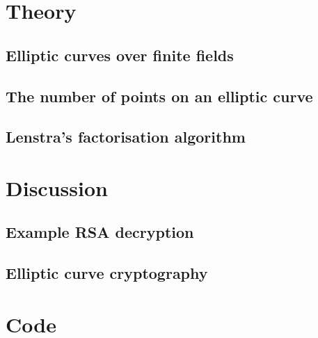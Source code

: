 \documentclass[a4paper,12pt,titlepage,oneside]{article}
\begin{document}
\section{Theory}
\label{theory-section}
\subsection{Elliptic curves over finite fields}

\subsection{The number of points on an elliptic curve}

\subsection{Lenstra's factorisation algorithm}

\clearpage

\section{Discussion}
\label{discussion-section}
\subsection{Example RSA decryption}

\subsection{Elliptic curve cryptography}

\clearpage

\appendix
\section{Code}
\label{codeappendix}

\clearpage


\end{document}
